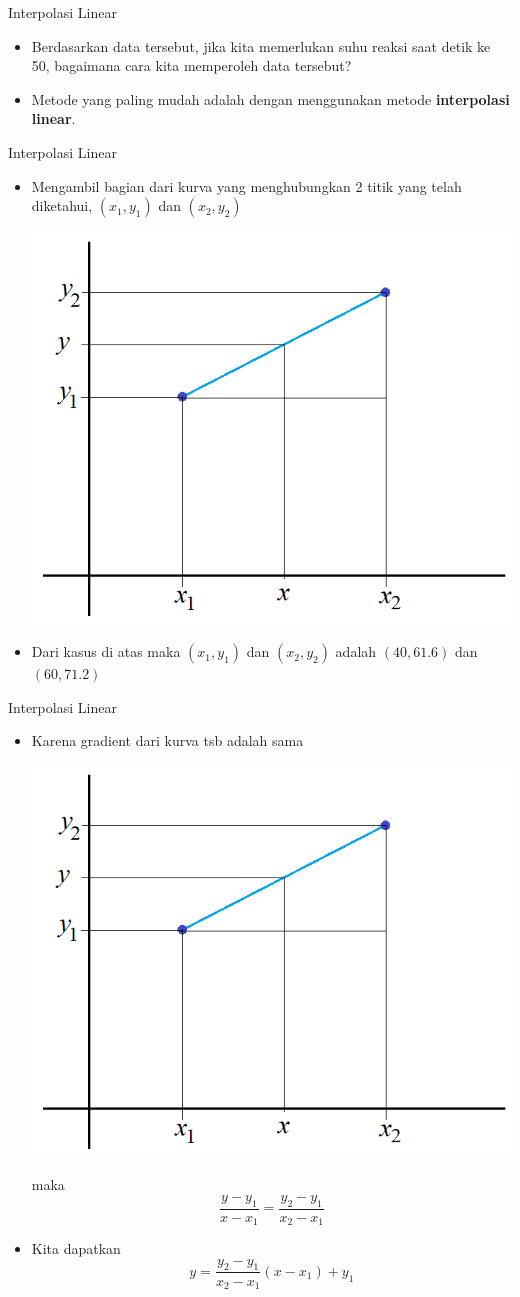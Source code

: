 \documentclass[pdflatex,compress]{beamer}
\begin{document}
\begin{frame}{Interpolasi Linear}
	\begin{itemize}
		\item Berdasarkan data tersebut, jika kita memerlukan suhu reaksi saat detik ke 50, bagaimana cara kita memperoleh data tersebut?
		\item Metode yang paling mudah adalah dengan menggunakan metode \textbf{interpolasi linear}.
	\end{itemize}
\end{frame}

\begin{frame}{Interpolasi Linear}
	\begin{itemize}
		\item Mengambil bagian dari kurva yang menghubungkan 2 titik yang telah diketahui, $ (x_1, y_1) $ dan $ (x_2, y_2) $
		\begin{center}
			\includegraphics[width=0.5\linewidth]{img/img03}
		\end{center}
		\item Dari kasus di atas maka $ (x_1, y_1) $ dan $ (x_2, y_2) $ adalah $ (40, 61.6) $ dan $ (60, 71.2) $
	\end{itemize}
\end{frame}

\begin{frame}{Interpolasi Linear}
	\begin{itemize}
		\item Karena gradient dari kurva tsb adalah sama
		\begin{center}
			\includegraphics[width=0.4\linewidth]{img/img03}
		\end{center}
		maka
		\begin{equation*}
			\frac{y - y_1}{x - x_1} = \frac{y_2 - y_1}{x_2 - x_1}
		\end{equation*}
		\item Kita dapatkan
		\begin{equation*}
			y= \frac{y_2 - y_1}{x_2 - x_1}(x - x_1) +  y_1
		\end{equation*}
	\end{itemize}
\end{frame}
\end{document}
